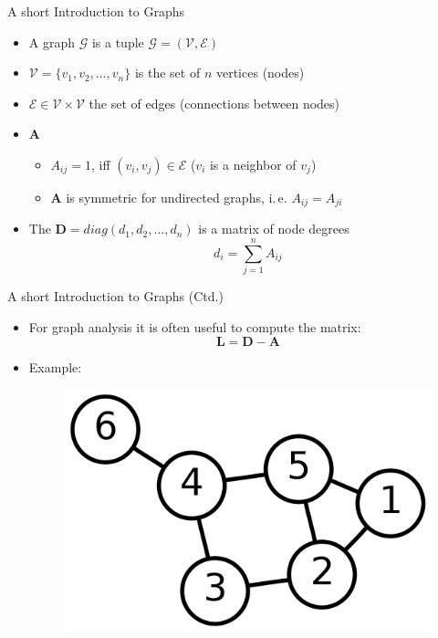 \begin{frame}{A short Introduction to Graphs}{}
	\begin{itemize}
		\item A graph $\mathcal{G}$ is a tuple $\mathcal{G} = (\mathcal{V}, \mathcal{E})$
		\item $\mathcal{V} = \{ v_1, v_2, \dots, v_n \}$ is the set of $n$ vertices (nodes)
		\item $\mathcal{E} \in \mathcal{V} \times \mathcal{V}$ the set of edges (connections between nodes)
		\item {} $\bm{A}$
		\begin{itemize}
			\item $A_{ij} = 1$, iff $(v_i, v_j) \in \mathcal{E}$ ($v_i$ is a neighbor of $v_j$)
			\item $\bm{A}$ is symmetric for undirected graphs, i.\,e. $A_{ij} = A_{ji}$
		\end{itemize}
		\item The  $\bm{D} = diag(d_1, d_2, \dots, d_n)$ is a matrix of node degrees
		\begin{equation*}
			d_i = \sum_{j=1}^n A_{ij}
		\end{equation*}
	\end{itemize}
\end{frame}


\begin{frame}{A short Introduction to Graphs (Ctd.)}{}
	\begin{itemize}
		\item For graph analysis it is often useful to compute the  matrix:
		\begin{equation*}
			\bm{L} = \bm{D} - \bm{A}
		\end{equation*}
		\item Example:
		\begin{figure}
			\centering
			\includegraphics[scale=0.08]{12_clustering/02_img/graph}
		\end{figure}
	\end{itemize}
\end{frame}


